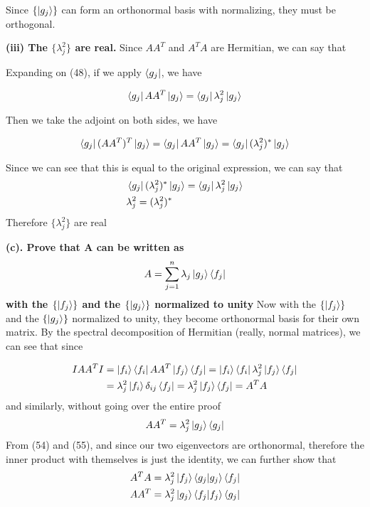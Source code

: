 \documentclass{article}
\newcommand{\Set}[1]{\{#1\}}
\begin{document}
Since $\Set{\ket{g_j}}$ can form an orthonormal basis with normalizing, they must be orthogonal.

\textbf{(iii) The $\{\lambda^2_j\}$ are real.}
Since $AA^T$ and $A^TA$ are Hermitian, we can say that

Expanding on (48), if we apply $\bra{g_j}$, we have

\begin{align}
    \bra{g_j} AA^T \ket{g_j }= \bra{g_j} \lambda^2_j \ket{g_j}
\end{align}

Then we take the adjoint on both sides, we have 

\begin{align}
    \bra{g_j} (AA^T)^T \ket{g_j } = \bra{g_j} AA^T \ket{g_j } = \bra{g_j} (\lambda^2_j)^* \ket{g_j}
\end{align}

Since we can see that this is equal to the original expression, we can say that 
\begin{align}
    &\bra{g_j} (\lambda^2_j)^* \ket{g_j} = \bra{g_j} \lambda^2_j \ket{g_j} \\
    &\lambda^2_j = (\lambda^2_j)^*
\end{align}
Therefore $\{\lambda^2_j\}$ are real

\textbf{(c). Prove that A can be written as}
\begin{align*}
    A = \sum_{j=1}^n \lambda_j \ket{g_j} \bra{f_j}
\end{align*}
\textbf{with the $\{\ket{f_j}\}$ and the $\{\ket{g_j}\}$ normalized to unity}
Now with the $\{\ket{f_j}\}$ and the $\{\ket{g_j}\}$ normalized to unity, they become orthonormal basis for their own matrix. By the spectral decomposition of Hermitian (really, normal matrices), we can see that since

\begin{align}
    IAA^TI &= \ket{f_i}\bra{f_i} AA^T \ket{f_j} \bra{f_j } = \ket{f_i}\bra{f_i} \lambda^2_j \ket{f_j} \bra{f_j } \\
    &=\lambda^2_j \ket{f_i} \delta_{ij} \bra{f_j} = \lambda^2_j \ket{f_j} \bra{f_j} = A^TA
\end{align}
and similarly, without going over the entire proof
\begin{align}
    AA^T = \lambda^2_j \ket{g_j} \bra{g_j}
\end{align}
From (54) and (55), and since our two eigenvectors are orthonormal, therefore the inner product with themselves is just the identity, we can further show that
\begin{align}
    A^T A &=\lambda_j^2 \ket{f_j} \bra{g_j} \ket{g_j} \bra{f_j} \\
    AA^T &=\lambda_j^2 \ket{g_j} \bra{f_j} \ket{f_j} \bra{g_j}
\end{align}
\end{document}
